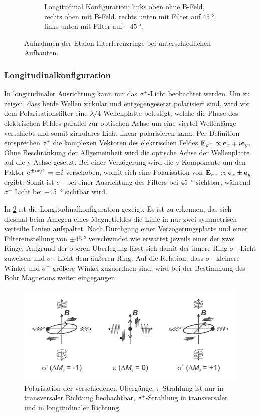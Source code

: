 \begin{figure}[h]
\begin{subfigure}{0.45\linewidth}
        \caption{Longitudinal Konfiguration: links oben ohne B-Feld, rechts oben mit B-Feld, 
        rechts unten mit Filter auf $\SI{+45}{\degree}$, links unten mit Filter auf $\SI{-45}{\degree}$. }
        \label{fig:longitudinal_konfiguration}
    \end{subfigure}
    \caption{Aufnahmen der Etalon Interferenzringe bei unterschiedlichen Aufbauten.}
\end{figure}


\subsubsection{Longitudinalkonfiguration}
In longitudinaler Ausrichtung kann nur das $\sigma^\pm$-Licht beobachtet werden. Um zu zeigen, 
dass beide Wellen zirkular und entgegengesetzt polarisiert sind, wird vor dem Polarisationsfilter 
eine $\lambda/4$-Wellenplatte befestigt, welche die Phase des elektrischen Feldes parallel 
zur optischen Achse um eine viertel Wellenlänge verschiebt und somit zirkulares Licht 
linear polarisieren kann. Per Definition entsprechen $\sigma^\pm$ die komplexen Vektoren des 
elektrischen Feldes 
$\vb E_\mathrm{\sigma^\mp} \propto \vb e_x \mp i\vb e_y$. Ohne Beschränkung der Allgemeinheit wird die optische Achse 
der Wellenplatte auf die y-Achse gesetzt. Bei einer Verzögerung wird die y-Komponente 
um den Faktor $\mathrm e^{\pm i\pi /2} = \pm i$ verschoben, womit sich eine Polarisation von 
$\vb E_\mathrm{\sigma^\mp}\propto \vb e_x \pm \vb e_y$ ergibt. Somit ist $\sigma^-$ 
bei einer Ausrichtung des Filters bei \SI{45}{\degree} sichtbar, während $\sigma^+$ Licht 
bei \SI{-45}{\degree} sichtbar wird. 

In \cref{fig:longitudinal_konfiguration} ist die Longitudinalkonfiguration gezeigt. Es ist zu erkennen,
das sich diesmal beim Anlegen eines Magnetfeldes die Linie in nur zwei symmetrisch verteilte Linien 
aufspaltet. Nach Durchgang einer Verzögerungsplatte und einer Filtereinstellung von $\pm\SI{45}{\degree}$
verschwindet wie erwartet jeweils einer der zwei Ringe. Aufgrund der oberen Überlegung 
lässt sich damit der innere Ring $\sigma^-$-Licht zuweisen und $\sigma^+$-Licht dem äußeren Ring.
Auf die Relation, dass $\sigma^-$ kleinere Winkel und $\sigma^+$ größere Winkel zuzuordnen sind, wird 
bei der Bestimmung des Bohr Magnetons weiter eingegangen.


\begin{figure}[htb]
    \centering
    \includegraphics[width=0.6\linewidth]{../figs/zeeman_polarisation}
    \caption{Polarisation der verschiedenen Übergänge. $\pi$-Strahlung ist nur in transversaler 
    Richtung beobachtbar, $\sigma^\pm$-Strahlung in transversaler und in longitudinaler 
    Richtung. \cite{zeeman_handblatt}}
    \label{fig:zeeman_polarisation}
\end{figure}

